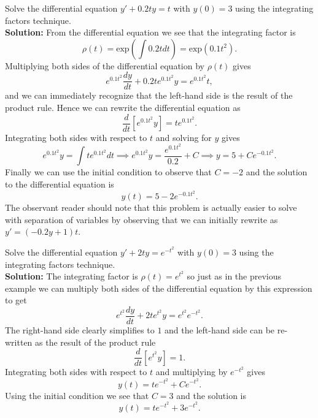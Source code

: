 \begin{example}
    Solve the differential equation $y' + 0.2ty = t$ with $y(0) = 3$ using the integrating
    factors technique.\\
    {\bf Solution: } From the differential equation we see that the integrating factor is
    \[ \rho(t) = \text{exp}\left( \int 0.2t dt \right) =
        \text{exp}\left( 0.1t^2 \right). \]
    Multiplying both sides of the differential equation by $\rho(t)$ gives
    \[ e^{0.1t^2} \frac{dy}{dt} + 0.2 t e^{0.1t^2} y = e^{0.1t^2} t, \]
    and we can immediately recognize that the left-hand side is the result of the product
    rule.  Hence we can rewrite the differential equation as
    \[ \frac{d}{dt}\left[ e^{0.1t^2} y \right] = te^{0.1t^2}. \]
    Integrating both sides with respect to $t$ and solving for $y$ gives 
    \[ e^{0.1t^2} y = \int t e^{0.1t^2} dt \implies e^{0.1t^2} y = \frac{e^{0.1t^2}}{0.2}
        + C \implies y = 5 + C e^{-0.1t^2}. \]
    Finally we can use the initial condition to observe that $C = -2$ and the solution to
    the differential equation is 
    \[ \boxed{y(t) = 5 - 2 e^{-0.1t^2}. } \]
    The observant reader should note that this problem is actually easier to solve with
    separation of variables by observing that we can initially rewrite as $y' = (-0.2y + 1
    )t$.
\end{example}

\begin{example}
    Solve the differential equation $y' + 2ty = e^{-t^2}$ with $y(0) = 3$ using the
    integrating factors technique. \\
    {\bf Solution:} The integrating factor is $\rho(t) = e^{t^2}$ so just as in the
    previous example we can multiply both sides of the differential equation by this
    expression to get 
    \[ e^{t^2} \frac{dy}{dt} + 2te^{t^2} y = e^{t^2} e^{-t^2}. \]
    The right-hand side clearly simplifies to $1$ and the left-hand side can be
    re-written as the result of the product rule
    \[ \frac{d}{dt} \left[ e^{t^2} y \right] = 1. \]
    Integrating both sides with respect to $t$ and multiplying by $e^{-t^2}$ gives
    \[ y(t) = te^{-t^2} + Ce^{-t^2}. \]
    Using the initial condition we see that $C = 3$ and the solution is
    \[ \boxed{y(t) = te^{-t^2} + 3e^{-t^2}.} \]
\end{example}


